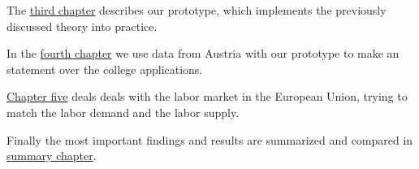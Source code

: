 The \hyperref[prototype]{third chapter} describes our prototype, which implements the previously discussed theory into practice.

In the \hyperref[evaluation_students]{fourth chapter} we use data from Austria with our prototype to make an statement over the college applications.

\hyperref[evaluation_labor]{Chapter five} deals deals with the labor market in the European Union, trying to match the labor demand and the labor supply.

Finally the most important findings and results are summarized and compared in \hyperref[summary]{summary chapter}.